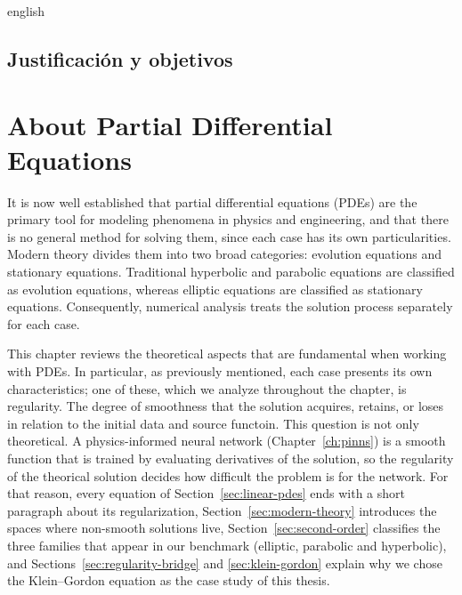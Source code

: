 \documentclass[11pt,letterpaper,twoside,openright]{book} %
\newif\ifreviewmode
\newcommand{\revtag}[2]{\ifreviewmode{\color{red!70!black}\textsf{\footnotesize[#1#2]}}\fi}
\newcommand{\verificar}[1]{\revtag{VERIFICAR}{: #1}}
\begin{document}
\begin{hyphenrules}{english}
\section*{Justificación y objetivos}\label{sec:objectives}
\verificar{NO OLVIDAR COPIAR!}

\chapter{About Partial Differential Equations}\label{ch:pdes}

It is now well established that partial differential equations (PDEs) are the primary tool for
modeling phenomena in physics and engineering, and that there is no general method for solving them,
since each case has its own particularities. Modern theory divides them into two broad categories:
evolution equations and stationary equations. Traditional hyperbolic and parabolic equations are
classified as evolution equations, whereas elliptic equations are classified as stationary equations.
Consequently, numerical analysis treats the solution process separately for each case.

This chapter reviews the theoretical aspects that are fundamental when working with PDEs. In particular, as previously mentioned, each case presents its own characteristics; one of these, which we analyze throughout the chapter, is regularity. The degree of smoothness that the solution acquires, retains, or loses in relation to the initial data and source functoin. This question is not only theoretical. A physics-informed neural
network (Chapter~\ref{ch:pinns}) is a smooth function that is trained by evaluating derivatives of the
solution, so the regularity of the theorical solution decides how difficult the problem
is for the network. For that reason, every equation of Section~\ref{sec:linear-pdes} ends with a short
paragraph about its regularization, Section~\ref{sec:modern-theory} introduces the spaces where non-smooth
solutions live, Section~\ref{sec:second-order} classifies the three families that appear in our benchmark
(elliptic, parabolic and hyperbolic), and Sections~\ref{sec:regularity-bridge} and \ref{sec:klein-gordon} explain why we
chose the Klein--Gordon equation as the case study of this thesis.


\end{hyphenrules}
\end{document}
